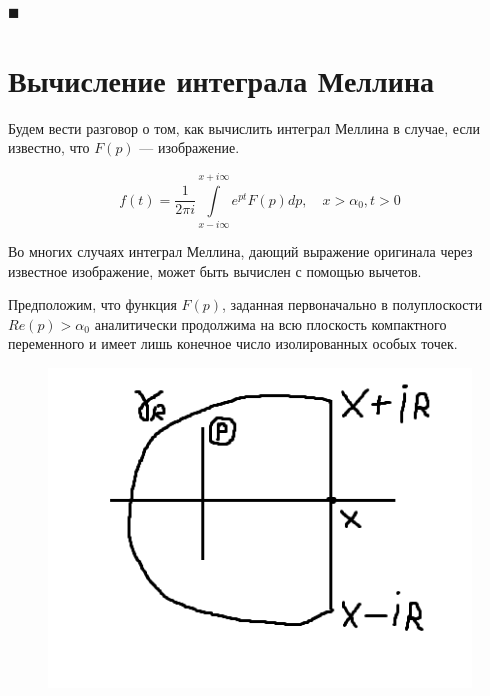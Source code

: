 \documentclass[a4paper, 12pt]{report}
\newenvironment{Proof}
{\par\noindent{\bf Доказательство.}}
{\hfill$\scriptstyle\blacksquare$}
\begin{document}
\begin{Proof}
\end{Proof}





    \section{Вычисление интеграла Меллина}
Будем вести разговор о том, как вычислить интеграл Меллина в случае, если известно, что $F(p)$ --- изображение.

    $$f(t) = \dfrac{1}{2\pi i}\int\limits_{x-i\infty}^{x+i\infty}e^{pt}F(p)dp,\quad x > \alpha_0, t > 0$$

Во многих случаях интеграл Меллина, дающий выражение оригинала через известное изображение, может быть вычислен с помощью вычетов.

Предположим, что функция $F(p)$, заданная первоначально в полуплоскости $Re(p) > \alpha_0$ аналитически продолжима на всю плоскость компактного переменного и имеет лишь конечное число изолированных особых точек.

\begin{figure} 
    \vspace{0ex}
    \includegraphics{zamknytiyKontur.png}
\end{figure}
\end{document}
